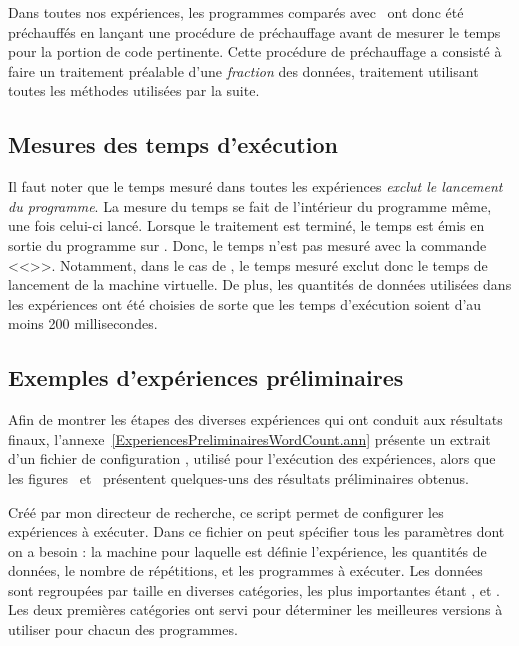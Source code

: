Dans toutes nos exp\'eriences, les programmes  comparés avec \ppff\ ont donc \'et\'e pr\'echauff\'es en lan\c{c}ant une proc\'edure de pr\'echauffage avant de mesurer le temps pour la portion de code pertinente. Cette proc\'edure de pr\'echauffage a consisté à faire un traitement préalable d'une \emph{fraction} des données, traitement utilisant toutes les m\'ethodes utilis\'ees par la suite.

\subsection{Mesures des temps d'exécution}
 
Il faut noter que le temps mesur\'e dans toutes les exp\'eriences \emph{exclut le lancement du programme}. La mesure du temps se fait de l'int\'erieur du programme m\^eme, une fois celui-ci lanc\'e. Lorsque le traitement est termin\'e, le temps est \'emis en sortie du programme sur . Donc, le temps n'est pas mesur\'e avec la commande <<>>. Notamment, dans le cas de , le temps mesuré exclut donc le temps de lancement de la machine virtuelle. De plus, les quantit\'es de donn\'ees utilis\'ees dans les exp\'eriences ont \'et\'e choisies de sorte que les temps d'ex\'ecution soient d'au moins 200 millisecondes.


\subsection{Exemples d'expériences préliminaires}



Afin de montrer les \'etapes des diverses exp\'eriences qui ont conduit aux r\'esultats finaux, l'annexe~\ref{ExperiencesPreliminairesWordCount.ann} pr\'esente un extrait d'un fichier de configuration , utilis\'e pour l'ex\'ecution des expériences, alors que les figures~ et~ présentent quelques-uns des r\'esultats préliminaires obtenus.

Cr\'e\'e par mon directeur de recherche, ce script permet de configurer les expériences \`a ex\'ecuter. Dans ce fichier on peut sp\'ecifier tous les param\`etres dont on a besoin : la machine pour laquelle est définie l'expérience, les quantités de donn\'ees, le nombre de r\'ep\'etitions, et les programmes \`a ex\'ecuter. Les donn\'ees sont regroup\'ees par taille en diverses cat\'egories, les plus importantes étant ,  et . Les deux premi\`eres cat\'egories ont servi pour d\'eterminer les meilleures versions \`a utiliser pour chacun des programmes. 

